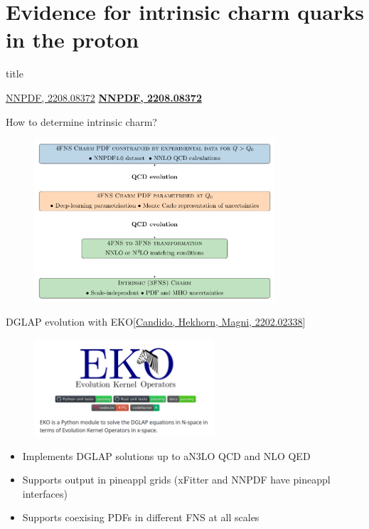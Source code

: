 \documentclass[aspectratio=43, 8pt,t]{beamer}
\newcommand{\SectionTitleFrame}[1][]{%
  \begin{frame}
    \vfill
    \centering
    \begin{beamercolorbox}[sep=8pt,center,shadow=true,rounded=true]{title}
      \usebeamerfont{title}\insertsection\par
    \end{beamercolorbox}
    \ifx\relax#1\relax\else
      \vspace{0.5cm}
      \textbf{#1}
    \fi
    \vfill
  \end{frame}
}
\begin{document}
\section*{Evidence for intrinsic charm quarks in the proton}
\SectionTitleFrame[\hyperlink{https://arxiv.org/abs/2208.08372}{NNPDF, 2208.08372}]

\begin{frame}{How to determine intrinsic charm?}
  \begin{figure}
    \includegraphics[width=0.8\textwidth]{strategy.pdf}
  \end{figure}

\end{frame}

\begin{frame}{DGLAP evolution with EKO}{\color{gray}\footnotesize [\hyperlink{https://arxiv.org/abs/2202.02338}{Candido, Hekhorn, Magni, 2202.02338}]}
  \begin{figure}
    \includegraphics[width=0.6\textwidth]{eko_header.png}
  \end{figure}
  \begin{itemize}
    \item Implements DGLAP solutions up to aN3LO QCD and NLO QED
    \item Supports output in pineappl grids (xFitter and NNPDF have pineappl interfaces)
    \item Supports coexising PDFs in different FNS at all scales
  \end{itemize}

\end{frame}
\end{document}
